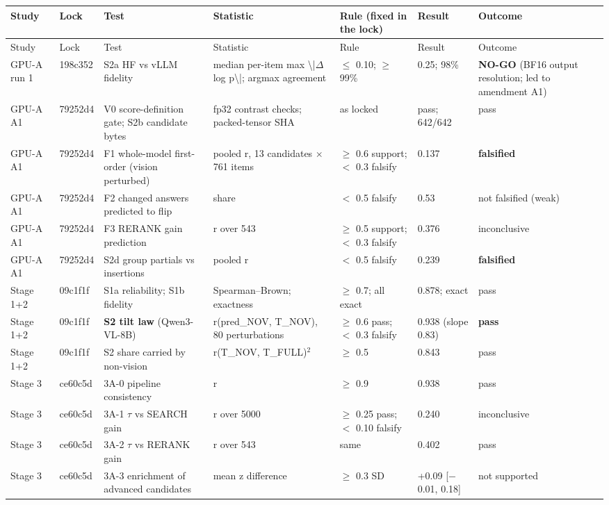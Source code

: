 \begin{longtable}{p{1.2cm}p{1.3cm}p{3.8cm}p{2.1cm}p{2.1cm}p{2.4cm}p{2.7cm}}
\toprule
Study & Lock & Test & Statistic & Rule (fixed in the lock) & Result & Outcome \\
\midrule
\endfirsthead
\toprule
Study & Lock & Test & Statistic & Rule & Result & Outcome \\
\midrule
\endhead
GPU-A run 1 & 198c352 & S2a HF vs vLLM fidelity & median per-item max \textbackslash{}|$\Delta$log p\textbackslash{}|; argmax agreement & $\le$ 0.10; $\ge$ 99\% & 0.25; 98\% & \textbf{NO-GO} (BF16 output resolution; led to amendment A1) \\
GPU-A A1 & 79252d4 & V0 score-definition gate; S2b candidate bytes & fp32 contrast checks; packed-tensor SHA & as locked & pass; 642/642 & pass \\
GPU-A A1 & 79252d4 & F1 whole-model first-order (vision perturbed) & pooled r, 13 candidates $\times$ 761 items & $\ge$ 0.6 support; $<$ 0.3 falsify & 0.137 & \textbf{falsified} \\
GPU-A A1 & 79252d4 & F2 changed answers predicted to flip & share & $<$ 0.5 falsify & 0.53 & not falsified (weak) \\
GPU-A A1 & 79252d4 & F3 RERANK gain prediction & r over 543 & $\ge$ 0.5 support; $<$ 0.3 falsify & 0.376 & inconclusive \\
GPU-A A1 & 79252d4 & S2d group partials vs insertions & pooled r & $<$ 0.5 falsify & 0.239 & \textbf{falsified} \\
Stage 1+2 & 09c1f1f & S1a reliability; S1b fidelity & Spearman--Brown; exactness & $\ge$ 0.7; all exact & 0.878; exact & pass \\
Stage 1+2 & 09c1f1f & \textbf{S2 tilt law} (Qwen3-VL-8B) & r(pred\_NOV, T\_NOV), 80 perturbations & $\ge$ 0.6 pass; $<$ 0.3 falsify & 0.938 (slope 0.83) & \textbf{pass} \\
Stage 1+2 & 09c1f1f & S2 share carried by non-vision & r(T\_NOV, T\_FULL)$^2$ & $\ge$ 0.5 & 0.843 & pass \\
Stage 3 & ce60c5d & 3A-0 pipeline consistency & r & $\ge$ 0.9 & 0.938 & pass \\
Stage 3 & ce60c5d & 3A-1 $\tau$ vs SEARCH gain & r over 5000 & $\ge$ 0.25 pass; $<$ 0.10 falsify & 0.240 & inconclusive \\
Stage 3 & ce60c5d & 3A-2 $\tau$ vs RERANK gain & r over 543 & same & 0.402 & pass \\
Stage 3 & ce60c5d & 3A-3 enrichment of advanced candidates & mean z difference & $\ge$ 0.3 SD & +0.09 [$-$0.01, 0.18] & not supported \\

\end{longtable}
